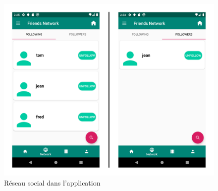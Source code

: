 \begin{figure}
    \begin{center}
        \includegraphics[width=1\textwidth]{img/screenshots/ViewPager2.png}
    \end{center}
    \caption{Réseau social dans l'application}
    \label{view_pager2}
\end{figure}

